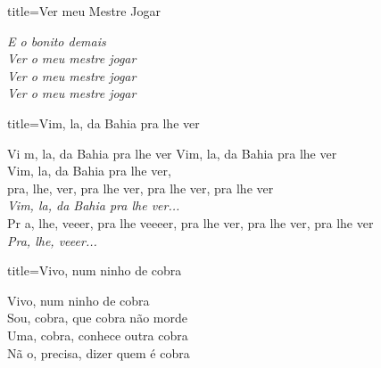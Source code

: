 \documentclass[fontsize=14pt, paper=a4, twoside, DIV=20]{scrreprt} %
\begin{document}
\begin{multicols*}{2}
\begin{song}{title={Ver meu Mestre Jogar}}
\begin{verse*}
            \textit{E o bonito demais \\
            Ver o meu mestre jogar \\
            Ver o meu mestre jogar \\
            Ver o meu mestre jogar \\ }
    \end{verse*}
        
\end{song}
\begin{song}{title={Vim, la, da Bahia pra lhe ver}}
        \begin{verse*}
            Vi m, la, da Bahia pra lhe ver
            Vim, la, da Bahia pra lhe ver\\
            Vim, la, da Bahia pra lhe ver,\\
            pra, lhe, ver, pra lhe ver, pra lhe ver, pra lhe ver\\
            \textit{Vim, la, da Bahia pra lhe ver...}\\
            Pr a, lhe, veeer, pra lhe veeeer, pra lhe ver, pra lhe ver, pra lhe ver\\
            \textit{Pra, lhe, veeer...}\\
        \end{verse*}
\end{song}

\begin{song}{title={Vivo, num ninho de cobra}}
        \begin{verse*}
            Vivo, num ninho de cobra \\
            Sou, cobra, que cobra não morde\\
            Uma, cobra, conhece outra cobra\\
            Nã o, precisa, dizer quem é cobra\\
        \end{verse*}
\end{song}


\end{multicols*}
\end{document}
